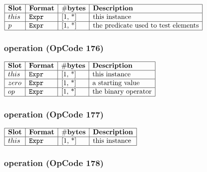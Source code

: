 \noindent
\(\begin{array}{| l | l | l | l |}
    \hline
    \bf{Slot} & \bf{Format} & \bf{\#bytes} & \bf{Description} \\
    \hline
         this & \lst{Expr} & \text{[1, *]} & \text{this instance} \\
    \hline
           p & \lst{Expr} & \text{[1, *]} & \text{the predicate used to test elements} \\
    \hline
      
\end{array}\)
       

\subsubsection{ operation (OpCode 176)}

\noindent
\(\begin{array}{| l | l | l | l |}
    \hline
    \bf{Slot} & \bf{Format} & \bf{\#bytes} & \bf{Description} \\
    \hline
         this & \lst{Expr} & \text{[1, *]} & \text{this instance} \\
    \hline
           zero & \lst{Expr} & \text{[1, *]} & \text{a starting value} \\
    \hline
           op & \lst{Expr} & \text{[1, *]} & \text{the binary operator} \\
    \hline
      
\end{array}\)
       

\subsubsection{ operation (OpCode 177)}

\noindent
\(\begin{array}{| l | l | l | l |}
    \hline
    \bf{Slot} & \bf{Format} & \bf{\#bytes} & \bf{Description} \\
    \hline
         this & \lst{Expr} & \text{[1, *]} & \text{this instance} \\
    \hline
      
\end{array}\)
       

\subsubsection{ operation (OpCode 178)}

